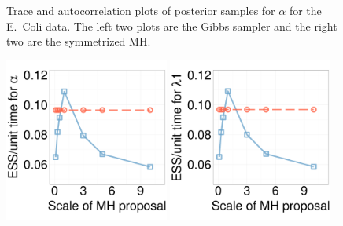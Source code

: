 \begin{figure}[]
\begin{minipage}[!hp]{0.99\linewidth}
  \end{minipage}
    \caption{Trace and autocorrelation plots of posterior samples for $\alpha$ for the E.\ Coli data. The left two plots are the Gibbs sampler and the right two are the symmetrized MH. }
     \label{fig:TRACE_ECOLI}
     \vspace{-.1in}
  \end{figure}
  \begin{figure}[]
  \centering
  \begin{minipage}[!hp]{.55\linewidth}
	\includegraphics [width=0.48\textwidth, angle=0]{figs/new_experiment_figs/ecoli_alpha.pdf}
	\includegraphics [width=0.48\textwidth, angle=0]{figs/new_experiment_figs/ecoli_l1.pdf}

\end{minipage}
\end{figure}
